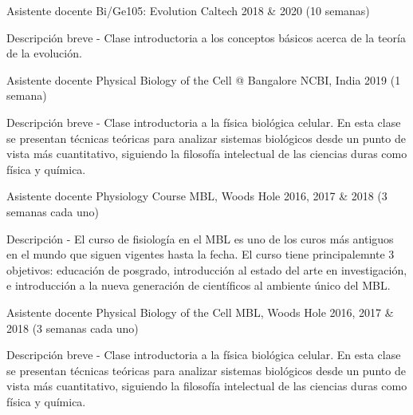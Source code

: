 

\begin{cventries}

  \cventry
    {Asistente docente} %
    {Bi/Ge105: Evolution} %
    {Caltech} %
    {2018 \& 2020 (10 semanas)} %
    {
      \begin{cvitems} %
        \item {Descripción breve - Clase introductoria a los conceptos básicos
        acerca de la teoría de la evolución.}
      \end{cvitems}
    }
  \cventry
    {Asistente docente} %
    {Physical Biology of the Cell @ Bangalore} %
    {NCBI, India} %
    {2019 (1 semana)} %
    {
      \begin{cvitems} %
        \item {Descripción breve - Clase introductoria a la física biológica
        celular. En esta clase se presentan técnicas teóricas para analizar
        sistemas biológicos desde un punto de vista más cuantitativo, siguiendo
        la filosofía intelectual de las ciencias duras como física y química.\\}
      \end{cvitems}
    }

  \cventry
    {Asistente docente} %
    {Physiology Course} %
    {MBL, Woods Hole} %
    {2016, 2017 \& 2018 (3 semanas cada uno)} %
    {
      \begin{cvitems} %
        \item {Descripción - El curso de fisiología en el MBL es uno de los 
        curos más antiguos en el mundo que siguen vigentes hasta la fecha. El 
        curso tiene principalemnte 3 objetivos: educación de posgrado,
        introducción al estado del arte en investigación, e introducción a la
        nueva generación de científicos al ambiente único del MBL.}
      \end{cvitems}
    }

  \cventry
    {Asistente docente} %
    {Physical Biology of the Cell} %
    {MBL, Woods Hole} %
    {2016, 2017 \& 2018 (3 semanas cada uno)} %
    {
      \begin{cvitems} %
        \item {Descripción breve - Clase introductoria a la física biológica
        celular. En esta clase se presentan técnicas teóricas para analizar
        sistemas biológicos desde un punto de vista más cuantitativo, siguiendo
        la filosofía intelectual de las ciencias duras como física y química.}
      \end{cvitems}
    }


\end{cventries}
